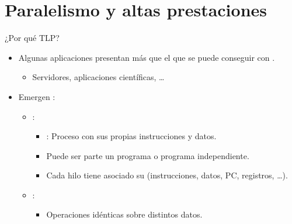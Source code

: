\section{Paralelismo y altas prestaciones}

\begin{frame}[t]{¿Por qué TLP?}
\begin{itemize}
  \item Algunas aplicaciones presentan más  que 
        el que se puede conseguir con .
    \begin{itemize}
      \item Servidores, aplicaciones científicas, \ldots
    \end{itemize}

  \item Emergen :
    \begin{itemize}
      \item {}:
        \begin{itemize}
          \item {}: Proceso con sus propias instrucciones y datos.
          \item Puede ser parte un programa o programa independiente.
          \item Cada hilo tiene asociado su  
                (instrucciones, datos, PC, registros, \ldots).
        \end{itemize}
      \item {}:
        \begin{itemize}
          \item Operaciones idénticas sobre distintos datos.
        \end{itemize}
    \end{itemize}
\end{itemize}
\end{frame}

